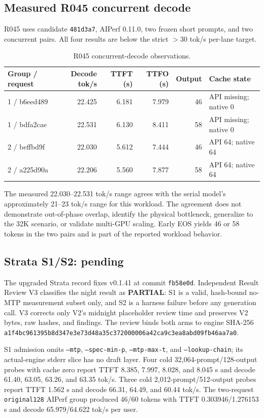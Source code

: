 \documentclass[11pt]{article}
\begin{document}
\subsection{Measured R045 concurrent decode}

R045 uses candidate \texttt{481d3a7}, AIPerf 0.11.0, two frozen short prompts, and two concurrent pairs. All four results are below the strict $>30$ tok/s per-lane target.

\begin{table}[t]
\centering
\scriptsize
\begin{tabular}{lrrrrl}
\toprule
Group / request & Decode tok/s & TTFT (s) & TTFO (s) & Output & Cache state \\
\midrule
1 / b6eed489 & 22.425 & 6.181 & 7.979 & 46 & API missing; native 0 \\
1 / bdfa2cae & 22.531 & 6.130 & 8.411 & 58 & API missing; native 0 \\
2 / beffbd9f & 22.030 & 5.612 & 7.444 & 46 & API 64; native 64 \\
2 / a225d90a & 22.206 & 5.560 & 7.877 & 58 & API 64; native 64 \\
\bottomrule
\end{tabular}
\caption{R045 concurrent-decode observations.}
\label{tab:r045}
\end{table}

The measured 22.030--22.531 tok/s range agrees with the serial model's approximately 21--23 tok/s range for this workload. The agreement does not demonstrate out-of-phase overlap, identify the physical bottleneck, generalize to the 32K scenario, or validate multi-GPU scaling. Early EOS yields 46 or 58 tokens in the two pairs and is part of the reported workload behavior.

\subsection{Strata S1/S2: pending}
\label{sec:strata}

The upgraded Strata record fixes v0.1.41 at commit \texttt{fb58e0d}. Independent Result Review V3 classifies the night result as \textbf{PARTIAL}: S1 is a valid, hash-bound no-MTP measurement subset only, and S2 is a harness failure before any generation call. V3 corrects only V2's midnight placeholder review time and preserves V2 bytes, raw hashes, and findings. The review binds both arms to engine SHA-256 \texttt{a1f4bc961395b8d347e3e73d48a35c372000006a42ca9c3ea8abd09fb46aa7a0}.

S1 admission omits \texttt{--mtp}, \texttt{--spec-min-p}, \texttt{--mtp-max-t}, and \texttt{--lookup-chain}; its actual-engine stderr slice has no draft layer. Four cold 32,064-prompt/128-output probes with cache zero report TTFT 8.385, 7.997, 8.028, and 8.045 s and decode 61.40, 63.05, 63.26, and 63.35 tok/s. Three cold 2,012-prompt/512-output probes report TTFT 1.562 s and decode 66.31, 64.49, and 60.44 tok/s. The two-request \texttt{original128} AIPerf group produced 46/60 tokens with TTFT 0.303946/1.276153 s and decode 65.979/64.622 tok/s per user.
\end{document}
